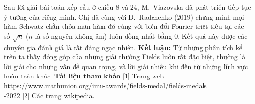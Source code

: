 \begin{multicols}{2}
	\vskip 0.1cm
	Sau lời giải bài toán xếp cầu ở chiều $8$ và $24$, M.~Viazovska đã phát triển tiếp tục ý tưởng của riêng mình. Chị đã cùng với D.~Radchenko ($2019$) chứng minh mọi hàm Schwatz chẵn thỏa mãn hàm đó cùng với biến đổi Fourier triệt tiêu tại các số $\sqrt{n}$ ($n$ là số nguyên không âm) luôn đồng nhất bằng $0$. Kết quả này được các chuyên gia đánh giá là rất đáng ngạc nhiên.
	\vskip 0.1cm
	{\bf\color{duongvaotoanhoc} Kết luận:}  Từ những phân tích kể trên ta thấy đóng góp của những giải thưởng Fields luôn rất đặc biệt, thường là lời giải cho những vấn đề quan trọng, và lời giải nhiều khi đến từ những lĩnh vực hoàn toàn khác.
	\vskip 0.1cm
	\textbf{\color{duongvaotoanhoc}Tài liệu tham khảo}
	\vskip 0.1cm
	[$1$] Trang web \url{https://www.mathunion.org/imu-awards/fields-medal/fields-medals}\\ \url{-2022}
	\vskip 0.1cm
	[$2$] Các trang wikipedia.
\end{multicols}

